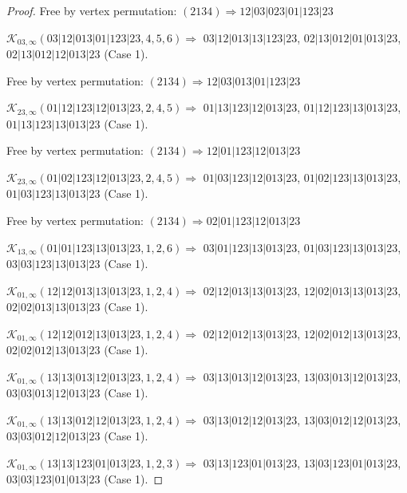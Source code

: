 \documentclass[12pt]{article}
\theoremstyle{plain}
\theoremstyle{definition}
\theoremstyle{remark}
\newcommand{\fancy}[1]{\mathcal{#1}}
\def\K{\fancy{K}}
\begin{document}
\begin{proof}
	Free by vertex permutation: $(2 1 3 4)\Rightarrow 12|03|023|01|123|23$
	
	
	\bigskip
	
	$\K_{03,\infty}(03|12|013|01|123|23,4, 5, 6)\Rightarrow $ $03|12|013|13|123|23$, $02|13|012|01|013|23$, $02|13|012|12|013|23$ (Case 1).
	
	
	
	Free by vertex permutation: $(2 1 3 4)\Rightarrow 12|03|013|01|123|23$
	
	
	\bigskip
	
	$\K_{23,\infty}(01|12|123|12|013|23,2, 4, 5)\Rightarrow $ $01|13|123|12|013|23$, $01|12|123|13|013|23$, $01|13|123|13|013|23$ (Case 1).
	
	
	
	Free by vertex permutation: $(2 1 3 4)\Rightarrow 12|01|123|12|013|23$
	
	
	\bigskip
	
	$\K_{23,\infty}(01|02|123|12|013|23,2, 4, 5)\Rightarrow $ $01|03|123|12|013|23$, $01|02|123|13|013|23$, $01|03|123|13|013|23$ (Case 1).
	
	
	
	Free by vertex permutation: $(2 1 3 4)\Rightarrow 02|01|123|12|013|23$
	
	
	\bigskip
	
	$\K_{13,\infty}(01|01|123|13|013|23,1, 2, 6)\Rightarrow $ $03|01|123|13|013|23$, $01|03|123|13|013|23$, $03|03|123|13|013|23$ (Case 1).
	
	\bigskip
	
	$\K_{01,\infty}(12|12|013|13|013|23,1, 2, 4)\Rightarrow $ $02|12|013|13|013|23$, $12|02|013|13|013|23$, $02|02|013|13|013|23$ (Case 1).
	
	\bigskip
	
	$\K_{01,\infty}(12|12|012|13|013|23,1, 2, 4)\Rightarrow $ $02|12|012|13|013|23$, $12|02|012|13|013|23$, $02|02|012|13|013|23$ (Case 1).
	
	\bigskip
	
	$\K_{01,\infty}(13|13|013|12|013|23,1, 2, 4)\Rightarrow $ $03|13|013|12|013|23$, $13|03|013|12|013|23$, $03|03|013|12|013|23$ (Case 1).
	
	\bigskip
	
	$\K_{01,\infty}(13|13|012|12|013|23,1, 2, 4)\Rightarrow $ $03|13|012|12|013|23$, $13|03|012|12|013|23$, $03|03|012|12|013|23$ (Case 1).
	
	\bigskip
	
	$\K_{01,\infty}(13|13|123|01|013|23,1, 2, 3)\Rightarrow $ $03|13|123|01|013|23$, $13|03|123|01|013|23$, $03|03|123|01|013|23$ (Case 1).
	

\end{proof}
\end{document}
